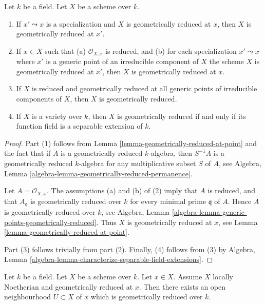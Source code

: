 \begin{lemma}
\label{lemma-generic-points-geometrically-reduced}
Let $k$ be a field.
Let $X$ be a scheme over $k$.
\begin{enumerate}
\item If $x' \leadsto x$ is a specialization and $X$ is geometrically
reduced at $x$, then $X$ is geometrically reduced at $x'$.
\item If $x \in X$ such that (a) $\mathcal{O}_{X, x}$
is reduced, and (b) for each specialization $x' \leadsto x$ where
$x'$ is a generic point of an irreducible component of $X$ the
scheme $X$ is geometrically reduced at $x'$, then $X$ is geometrically
reduced at $x$.
\item If $X$ is reduced and geometrically reduced at all generic
points of irreducible components of $X$, then $X$ is geometrically
reduced.
\item If $X$ is a variety over $k$,
then $X$ is geometrically reduced if and only if its function field
is a separable extension of $k$.
\end{enumerate}
\end{lemma}

\begin{proof}
Part (1) follows from
Lemma \ref{lemma-geometrically-reduced-at-point}
and the fact that if $A$ is a geometrically reduced
$k$-algebra, then $S^{-1}A$ is a geometrically reduced $k$-algebra for
any multiplicative subset $S$ of $A$, see
Algebra, Lemma \ref{algebra-lemma-geometrically-reduced-permanence}.

\medskip\noindent
Let $A = \mathcal{O}_{X, x}$. The assumptions (a) and (b) of (2) imply
that $A$ is reduced, and that $A_{\mathfrak q}$ is geometrically
reduced over $k$ for every minimal prime $\mathfrak q$ of $A$.
Hence $A$ is geometrically reduced over $k$, see
Algebra, Lemma \ref{algebra-lemma-generic-points-geometrically-reduced}.
Thus $X$ is geometrically reduced at $x$, see
Lemma \ref{lemma-geometrically-reduced-at-point}.

\medskip\noindent
Part (3) follows trivially from part (2). Finally, (4) follows
from (3) by Algebra,
Lemma \ref{algebra-lemma-characterize-separable-field-extensions}.
\end{proof}

\begin{lemma}
\label{lemma-Noetherian-geometrically-reduced-at-point}
Let $k$ be a field.
Let $X$ be a scheme over $k$.
Let $x \in X$.
Assume $X$ locally Noetherian and geometrically reduced at $x$.
Then there exists an open neighbourhood $U \subset X$ of $x$
which is geometrically reduced over $k$.
\end{lemma}

